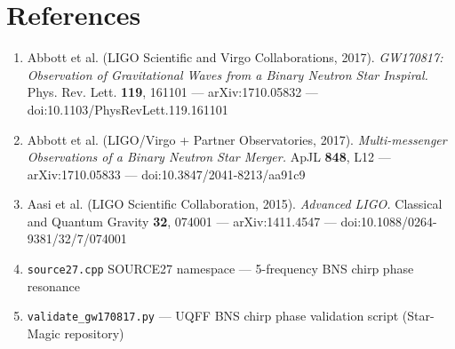 \documentclass[11pt]{article}
\begin{document}
\section*{References}

\begin{enumerate}
  \item Abbott et al. (LIGO Scientific and Virgo Collaborations, 2017). \emph{GW170817: Observation of Gravitational Waves from a Binary Neutron Star Inspiral.} Phys. Rev. Lett. \textbf{119}, 161101 --- arXiv:1710.05832 --- doi:10.1103/PhysRevLett.119.161101
  \item Abbott et al. (LIGO/Virgo + Partner Observatories, 2017). \emph{Multi-messenger Observations of a Binary Neutron Star Merger.} ApJL \textbf{848}, L12 --- arXiv:1710.05833 --- doi:10.3847/2041-8213/aa91c9
  \item Aasi et al. (LIGO Scientific Collaboration, 2015). \emph{Advanced LIGO.} Classical and Quantum Gravity \textbf{32}, 074001 --- arXiv:1411.4547 --- doi:10.1088/0264-9381/32/7/074001
  \item \verb|source27.cpp| SOURCE27 namespace --- 5-frequency BNS chirp phase resonance
  \item \verb|validate_gw170817.py| --- UQFF BNS chirp phase validation script (Star-Magic repository)
\end{enumerate}


\end{document}
